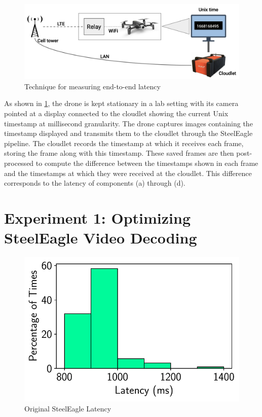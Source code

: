 \begin{figure}[htbp]
\centerline{\includegraphics[width = .8\textwidth]{figs/mtp_pipeline.png}}
\caption{Technique for measuring end-to-end latency}
\label{fig:latency-measuring-technique}
\end{figure}
As shown in \cref{fig:latency-measuring-technique}, the drone is kept
stationary in a lab setting with its camera pointed at a display connected to
the cloudlet showing the current Unix timestamp at millisecond granularity. The
drone captures images containing the timestamp displayed and transmits them to
the cloudlet through the SteelEagle pipeline. The cloudlet records the
timestamp at which it receives each frame, storing the frame along with this
timestamp. These saved frames are then
post-processed to compute the difference between the timestamps shown in each
frame and the timestamps at which they were received at the cloudlet. This
difference corresponds to the latency of components (a) through (d).

\section{Experiment 1: Optimizing SteelEagle Video Decoding}
\label{sec:exp1}

\begin{figure}[htbp]
\centerline{\includegraphics[width = .4\textwidth]{figs/bala_latency.pdf}}
\caption{Original SteelEagle Latency \cite{bala2024}}
\label{fig:steeleagle-original-latency}
\end{figure}


